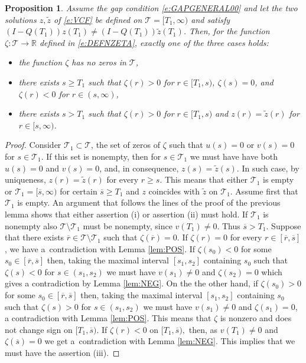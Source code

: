 \documentclass[a4paper,11pt,reqno]{amsart}
\theoremstyle{plain}
\newtheorem{prop}[lem]{Proposition}
\theoremstyle{definition}
\numberwithin{equation}{section}
\newcommand{\R}{\mathbb{R}}
\newcommand{\calt}{\mathcal T}
\renewcommand{\geq}{\geqslant}
\begin{document}
\begin{prop}\label{prop:zeta_2}
	Assume the gap condition \eqref{e:GAPGENERAL00} and let the two solutions $z, \tilde{z}$ of \eqref{e:VCF} be defined on $\calt=[T_1,\infty)$ and satisfy $(I-Q(T_1))z(T_1)\neq (I-Q(T_1))\tilde z(T_1)$.
    Then, for the function $\zeta\colon\calt\to\R$ defined in \eqref{e:DEFNZETA}, exactly one of the three cases holds:
    \begin{itemize}
        \item[(i)] the function $\zeta$ has no zeros in $\calt$,
        \item[(ii)] there exists $s\geq T_1$ such that  $\zeta(r)>0$ for $r\in [T_1,s)$, $\zeta(s)=0$, and $\zeta(r)<0$ for $r\in (s,\infty)$,
        \item[(iii)] there exists $s>T_1$ such that $\zeta(r)>0$ for $r\in [T_1,s)$ and $z(r)=\tilde z(r)$ for $r\in [s,\infty)$. 
    \end{itemize} 
\end{prop}

\begin{proof}
	Consider $\calt_1\subset \calt$, the set of  zeros of $\zeta$ such that $u(s)= 0$ or $v(s)=0$ for $s\in \calt_1$. If this set is nonempty, then for $s\in \calt_1$ we must have have both $u(s)=0$ and $v(s)=0$, and, in consequence, $z(s) = \tilde z(s)$.  In such case, by uniqueness, $z(r) = \tilde z(r)$ for every $r\geq s$. This means that either  $\calt_1$ is empty or $\calt_1 = [\overline s,\infty)$ for certain $\overline s\geq T_1$ and $z$ coincides with $\tilde z$ on $\calt_1$. Assume first that $\calt_1$ is empty. An argument that follows the lines of the proof of the previous lemma shows that either assertion (i) or assertion (ii) must hold.  If $\calt_1$ is nonempty also $\calt\setminus\calt_1$ must be nonempty, since $v(T_1)\neq 0$. Thus $\overline{s}>T_1$. Suppose that there exists $\overline{r}\in \calt\setminus \calt_1$ such that $\zeta(\overline{r})=0$. If $\zeta(r)=0$ for every $r\in [\overline{r},\overline{s}]$, we have a~contradiction with Lemma \ref{lem:POS}. If $\zeta(s_0)<0$ for some $s_0\in [\overline{r},\overline{s}]$ then, taking the maximal interval $[s_1,s_2]$ containing $s_0$ such that $\zeta(s)<0$ for $s\in (s_1,s_2)$ we must have $v(s_1)\neq 0$ and $\zeta(s_2)=0$ which gives a contradiction by Lemma \ref{lem:NEG}. On the the other hand, if $\zeta(s_0)>0$ for some $s_0\in [\overline{r},\overline{s}]$ then, taking the maximal interval $[s_1,s_2]$ containing $s_0$ such that $\zeta(s)>0$ for $s\in (s_1,s_2)$ we must  have $v(s_1)\neq 0$ and $\zeta(s_1)=0$, a contradiction with Lemma \ref{lem:POS}. This means that $\zeta$ is nonzero and does not change sign on $[T_1,\overline{s})$. If $\zeta(r)<0$ on  $[T_1,\overline{s}),$ then, as $v(T_1)\neq 0$ and $\zeta(\overline{s})=0$ we get a~contradiction with Lemma \ref{lem:NEG}. This implies that we must have the assertion (iii). 
\end{proof}
\end{document}
